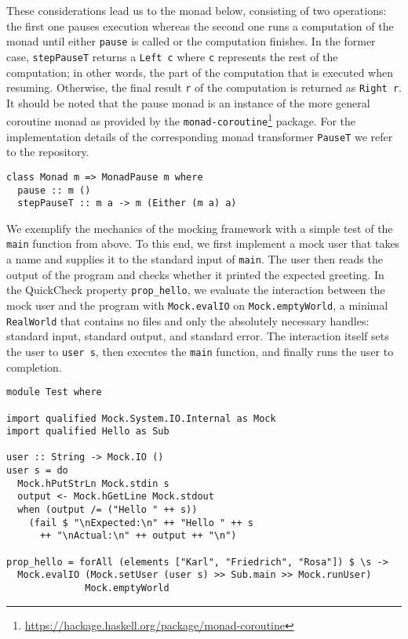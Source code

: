These considerations lead us to the monad below,
consisting of two operations:
the first one pauses execution whereas the second one runs a computation of the monad until either \texttt{pause} is called or the computation finishes.
In the former case,
\texttt{stepPauseT} returns a \texttt{Left c} where \texttt{c} represents the rest of the computation; in other words, the part of the computation that is executed when resuming.
Otherwise, the final result \texttt{r} of the computation is returned as \texttt{Right r}.
It should be noted that the pause monad is an instance of the more general coroutine monad as provided by the \texttt{monad-coroutine}\footnote{\url{https://hackage.haskell.org/package/monad-coroutine}} package.
For the implementation details of the corresponding monad transformer \texttt{PauseT} we refer to the repository.
\begin{verbatim}
class Monad m => MonadPause m where
  pause :: m ()
  stepPauseT :: m a -> m (Either (m a) a)
\end{verbatim}
We exemplify the mechanics of the mocking framework with a simple test of the \texttt{main} function from above.
To this end, we first implement a mock user that takes a name and supplies it to the standard input of \texttt{main}.
The user then reads the output of the program and checks whether it printed the expected greeting.
In the QuickCheck property \texttt{prop_hello},
we evaluate the interaction between the mock user and the program with \texttt{Mock.evalIO} on \texttt{Mock.emptyWorld}, a minimal \texttt{RealWorld} that contains no files and only the absolutely necessary handles: standard input, standard output, and standard error.
The interaction itself sets the user to \texttt{user s},
then executes the \texttt{main} function, and finally runs the user to completion.
\begin{verbatim}
module Test where

import qualified Mock.System.IO.Internal as Mock
import qualified Hello as Sub

user :: String -> Mock.IO ()
user s = do
  Mock.hPutStrLn Mock.stdin s
  output <- Mock.hGetLine Mock.stdout
  when (output /= ("Hello " ++ s))
    (fail $ "\nExpected:\n" ++ "Hello " ++ s
      ++ "\nActual:\n" ++ output ++ "\n")

prop_hello = forAll (elements ["Karl", "Friedrich", "Rosa"]) $ \s ->
  Mock.evalIO (Mock.setUser (user s) >> Sub.main >> Mock.runUser)
              Mock.emptyWorld
\end{verbatim}
